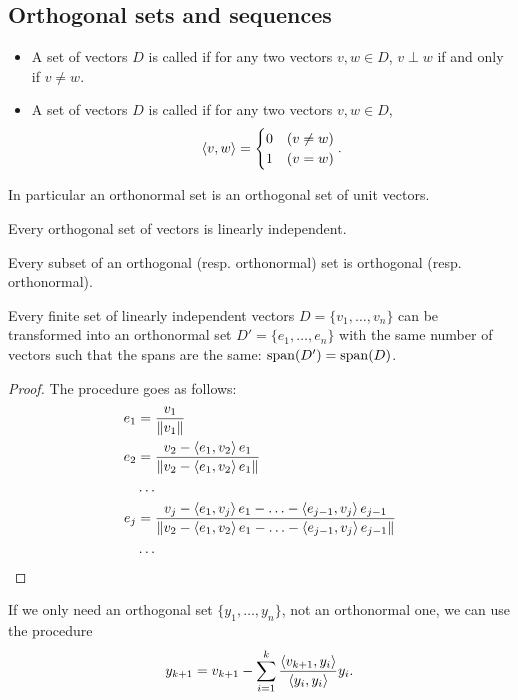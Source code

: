 \subsection{Orthogonal sets and sequences}
\begin{definition}
\begin{itemize}
\item A set of vectors $D$ is called  if for any two vectors $v,w\in D$, $v\perp w$ \textup{if and only if} $v\neq w$.
\item A set of vectors $D$ is called  if for any two vectors $v,w\in D$,
\[ \left\langle v,w \right\rangle = \begin{cases}
0 & (v\neq w) \\ 1 & (v=w)
\end{cases}. \]
\end{itemize}
In particular an orthonormal set is an orthogonal set of unit vectors.
\end{definition}

\begin{lemma} \label{orthogonalLinearlyIndependent}
Every orthogonal set of vectors is linearly independent.
\end{lemma}
\begin{lemma}
Every subset of an orthogonal (resp. orthonormal) set is orthogonal (resp. orthonormal).
\end{lemma}

\begin{theorem}
Every finite set of linearly independent vectors $D = \{v_1,\ldots, v_n\}$ can be transformed into an orthonormal set $D' = \{e_1,\ldots,e_n\}$ with the same number of vectors such that the spans are the same: $\operatorname{span}(D') = \operatorname{span}(D)$.
\end{theorem}
\begin{proof}
The procedure goes as follows:
\begin{align*}
e_1 &= \frac{v_1}{\lVert v_1\rVert} \\
e_2 &= \frac{v_2 - \left\langle e_1,v_2 \right\rangle e_1}{\lVert v_2 - \left\langle e_1,v_2 \right\rangle e_1\rVert} \\
&\hdots \\
e_j &= \frac{v_j - \left\langle e_1,v_j \right\rangle e_1- \ldots - \left\langle e_{j-1},v_j \right\rangle e_{j-1}}{\lVert v_2 - \left\langle e_1,v_2 \right\rangle e_1- \ldots - \left\langle e_{j-1},v_j \right\rangle e_{j-1}\rVert} \\
&\hdots
\end{align*}
\end{proof}

If we only need an orthogonal set $\{y_1,\ldots,y_n\}$, not an orthonormal one, we can use the procedure
\[ y_{k+1} = v_{k+1} - \sum_{i=1}^k \frac{\left\langle v_{k+1}, y_i \right\rangle}{\left\langle y_i,y_i \right\rangle}y_i. \]


